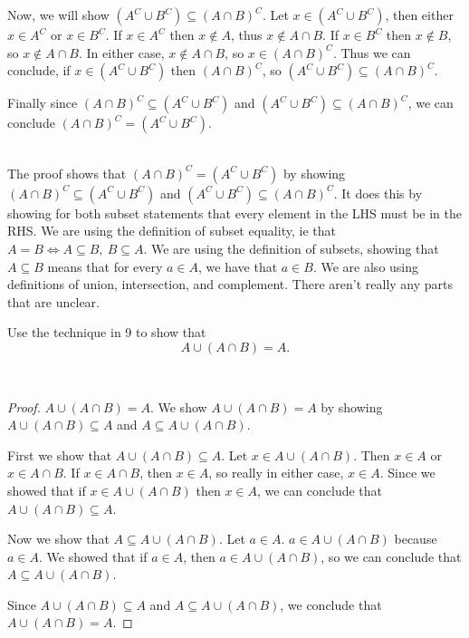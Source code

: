 \documentclass[12 pt]{exam}
\begin{document}
\begin{questions}
Now, we will show $(A^C \cup B^C) \subseteq (A \cap B)^C$. Let $x \in (A^C \cup B^C)$, then either $x \in A^C$ or $x \in B^C$.  If $x \in A^C$ then $x  \notin A$, thus $x  \notin A \cap B$. If $x \in B^C$ then $x  \notin B$, so $x  \notin A \cap B$.  In either case, $x  \notin A \cap B$, so $x \in (A \cap B)^C.$ Thus we can conclude, if $x \in (A^C \cup B^C)$ then $(A \cap B)^C$, so  $(A^C \cup B^C) \subseteq (A \cap B)^C$.

Finally since $(A \cap B)^C \subseteq (A^C \cup B^C)$ and $(A^C \cup B^C) \subseteq (A \cap B)^C$, we can conclude $(A \cap B)^C = (A^C \cup B^C)$.


\begin{solution} \\
The proof shows that $(A \cap B)^C = (A^C \cup B^C)$ by showing $(A \cap B)^C \subseteq (A^C \cup B^C)$ and $(A^C \cup B^C) \subseteq (A \cap B)^C$. It does this by showing for both subset statements that every element in the LHS must be in the RHS. We are using the definition of subset equality, ie that $A = B \iff A \subseteq B, \ B \subseteq A$. We are using the definition of subsets, showing that $A \subseteq B$ means that for every $a \in A$, we have that $a \in B$. We are also using definitions of union, intersection, and complement. There aren't really any parts that are unclear.
\end{solution}


\question Use the technique in 9 to show that $$A \cup (A \cap B) = A.$$

\begin{solution} \\
\begin{proof} $A \cup (A \cap B) = A$.
We show $A \cup (A \cap B) = A$ by showing $A \cup (A \cap B) \subseteq A$ and $A \subseteq A \cup (A \cap B)$.

First we show that $A \cup (A \cap B) \subseteq A$. Let $x \in A \cup (A \cap B)$. Then $x \in A$ or $x \in A \cap B$. If $x \in A \cap B$, then $x \in A$, so really in either case, $x \in A$. Since we showed that if $x \in A \cup (A \cap B)$ then $x \in A$, we can conclude that $A \cup (A \cap B) \subseteq A$.

Now we show that $A \subseteq A \cup (A \cap B)$. Let $a \in A$. $a \in A \cup (A \cap B)$ because $a \in A$. We showed that if $a \in A$, then $a \in A \cup (A \cap B)$, so we can conclude that $A \subseteq A \cup (A \cap B)$.

Since $A \cup (A \cap B) \subseteq A$ and $A \subseteq A \cup (A \cap B)$, we conclude that $A \cup (A \cap B) = A$.
\end{proof}
\end{solution}

\end{questions}
\end{document}

